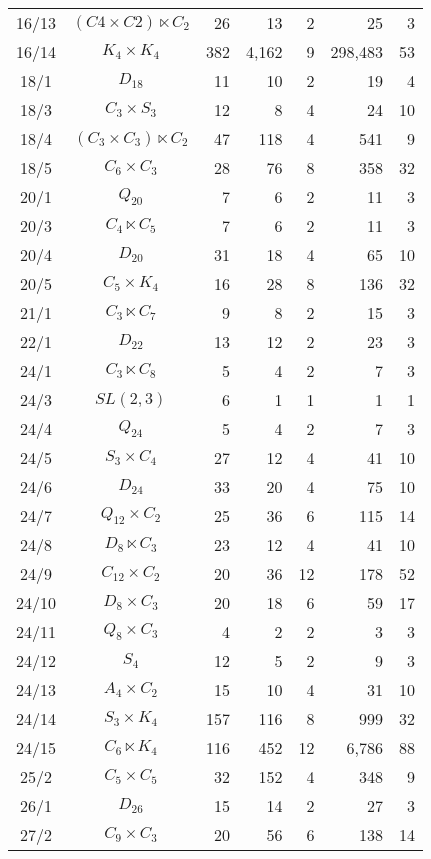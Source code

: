 \documentclass[a4paper,11pt]{article}
\theoremstyle{plain}
\theoremstyle{definition}
\begin{document}
\begin{longtable}{ccrrrrr}
	16/13 & $(C4 \times C2) \ltimes C_2$ & 26 & 13 & 2 & 25 & 3 \\ 
	16/14 & $K_4 \times K_4$ & 382 & 4,162 & 9 & 298,483 & 53  \\ 
	18/1 & $D_{18}$ & 11 & 10 & 2 & 19 & 4 \\ 
	18/3 & $C_3 \times S_3$ & 12 & 8 & 4 & 24 & 10 \\ 
	18/4 & $(C_3 \times C_3) \ltimes C_2$ & 47 & 118 & 4 & 541 & 9 \\ 
	18/5 & $C_6 \times C_3$ & 28 & 76 & 8 & 358 & 32 \\ 
	20/1 & $Q_{20}$ & 7 & 6 & 2 & 11 & 3 \\ 
	20/3 & $C_4 \ltimes C_5$ & 7 & 6 & 2 & 11 & 3 \\ 
	20/4 & $D_{20}$ & 31 & 18 & 4 & 65 & 10 \\ 
	20/5 & $C_5 \times K_4$ & 16 & 28 & 8 & 136 & 32 \\ 
	21/1 & $C_3 \ltimes C_7$ & 9 & 8 & 2 & 15 & 3 \\ 
	22/1 & $D_{22}$ & 13 & 12 & 2 & 23 & 3 \\ 
	24/1 & $C_3 \ltimes C_8$ & 5 & 4 & 2 & 7 & 3 \\ 
	24/3 & $SL(2,3)$ & 6 & 1 & 1 & 1 & 1 \\ 
	24/4 & $Q_{24}$ & 5 & 4 & 2 & 7 & 3 \\ 
	24/5 & $S_3 \times C_4$ & 27 & 12 & 4 & 41 & 10 \\ 
	24/6 & $D_{24}$ & 33 & 20 & 4 & 75 & 10 \\ 
	24/7 & $Q_{12} \times C_2$ & 25 & 36 & 6 & 115 & 14 \\ 
	24/8 & $D_8 \ltimes C_3$ & 23 & 12 & 4 & 41 & 10 \\ 
	24/9 & $C_{12} \times C_2$ & 20 & 36 & 12 & 178 & 52 \\ 
	24/10 & $D_8 \times C_3$ & 20 & 18 & 6 & 59 & 17 \\ 
	24/11 & $Q_8 \times C_3$ & 4 & 2 & 2 & 3 & 3 \\ 
	24/12 & $S_4$ & 12 & 5 & 2 & 9 & 3 \\ 
	24/13 & $A_4 \times C_2$ & 15 & 10 & 4 & 31 & 10 \\ 
	24/14 & $S_3 \times K_4$ & 157 & 116 & 8 & 999 & 32 \\ 
	24/15 & $C_6 \ltimes K_4$ & 116 & 452 & 12 & 6,786 & 88 \\ 
	25/2 & $C_5 \times C_5$ & 32 & 152 & 4 & 348 & 9 \\ 
	26/1 & $D_{26}$ & 15 & 14 & 2 & 27 & 3 \\ 
	27/2 & $C_9 \times C_3$ & 20 & 56 & 6 & 138 & 14 \\ 

\end{longtable}
\end{document}
